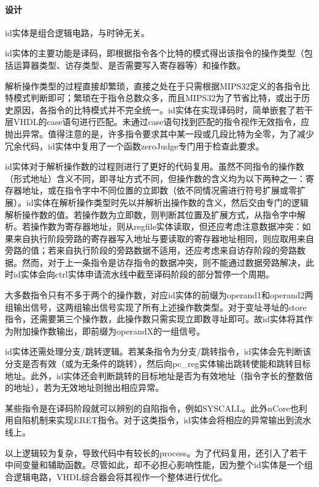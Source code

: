 \documentclass{article}
\begin{document}
\begin{spacing}{1.4}
\paragraph{设计}\mbox{}

id实体是组合逻辑电路，与时钟无关。

id实体的主要功能是译码，即根据指令各个比特的模式得出该指令的操作类型（包括运算器类型、访存类型、是否需要写入寄存器等）和操作数。

解析操作类型的过程直接却繁琐，直接之处在于只需根据MIPS32定义的各指令比特模式判断即可；繁琐在于指令总数众多，而且MIPS32为了节省比特，或出于历史原因，各指令的比特模式并不完全统一。id实体在实现译码时，简单嵌套了若干层VHDL的case语句进行匹配。未通过case语句找到匹配的指令视作无效指令，应抛出异常。值得注意的是，许多指令要求其中某一段或几段比特为全零，为了减少冗余代码，id实体中复用了一个函数zeroJudge专门用于检查此要求。

id实体对于解析操作数的过程则进行了更好的代码复用。虽然不同指令的操作数（形式地址）含义不同，即寻址方式不同，但操作数的含义均为以下两种之一：寄存器地址，或在指令字中不同位置的立即数（依不同情况需进行符号扩展或零扩展）。id实体在解析操作类型时先以并解析出操作数的含义，然后交由专门的逻辑解析操作数的值。若操作数为立即数，则判断其位置及扩展方式，从指令字中解析。若操作数为寄存器地址，则从regfile实体读取，但还应考虑注意数据冲突：如果来自执行阶段旁路的寄存器写入地址与要读取的寄存器地址相同，则应取用来自旁路的值；若来自执行阶段的旁路数据不适用，还应考虑来自访存阶段的旁路数据。然而，对于上一条指令是访存指令的数据冲突，则不能通过数据旁路解决，此时id实体会向ctrl实体申请流水线中截至译码阶段的部分暂停一个周期。

大多数指令只有不多于两个的操作数，对应id实体的前缀为operand1和operand2两组输出信号，这两组输出信号实现了所有上述操作数类型。对于变址寻址的store指令，还需要第三个操作数，此操作数只需实现立即数寻址即可。故id实体将其作为附加操作数输出，即前缀为operandX的一组信号。

id实体还需处理分支/跳转逻辑。若某条指令为分支/跳转指令，id实体会先判断该分支是否有效（或为无条件的跳转），然后向pc\_reg实体输出跳转使能和跳转目标地址。此外，id实体还会判断跳转的目标地址是否为有效地址（指令字长的整数倍的地址），若为无效地址则抛出相应异常。

某些指令是在译码阶段就可以辨别的自陷指令，例如SYSCALL。此外nCore也利用自陷机制来实现ERET指令。对于这类指令，id实体会将相应的异常输出到流水线上。

以上逻辑较为复杂，导致代码中有较长的process。为了代码复用，还引入了若干中间变量和辅助函数。尽管如此，却不必担心影响性能，因为整个id实体是一个组合逻辑电路，VHDL综合器会将其视作一个整体进行优化。


\end{spacing}
\end{document}
